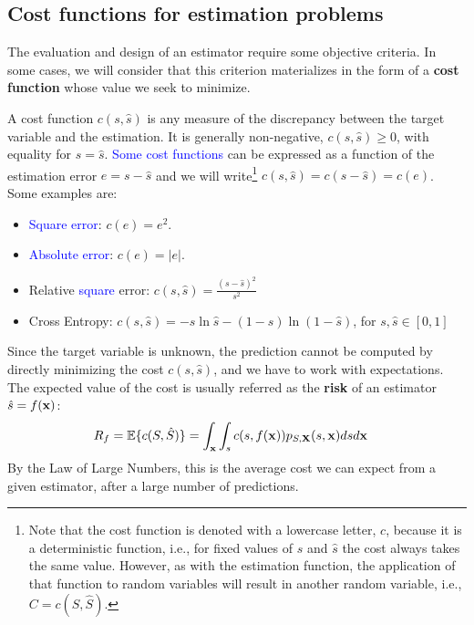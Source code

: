 \subsection{Cost functions for estimation problems}
\label{subsec_funcion_coste}

The evaluation and design of an estimator require some objective criteria. In some cases, we will consider that this criterion materializes in the form of a {\bf cost function} whose value we seek to minimize. %

A cost function $c(s,\hat s)$ is any measure of the discrepancy between the target variable and the estimation. It is generally non-negative, $c(s,\hat s) \geq 0$, with equality for $s = \hat s$. \textcolor{blue}{Some cost functions} can be expressed as a function of the estimation error $e= s-\hat s$ and we will write\footnote{Note that the cost function is denoted with a lowercase letter, $c$, because it is a deterministic function, i.e., for fixed values of $s$ and $\hat s$ the cost always takes the same value. However, as with the estimation function, the application of that function to random variables will result in another random variable, i.e., $C = c(S,\hat S)$.} $c(s,\hat s) = c(s - \hat s) = c(e)$. Some examples are:
\begin{itemize}
\item \textcolor{blue}{Square error}: $c(e) = e^2$.
\item \textcolor{blue}{Absolute error}: $c(e) = |e|$.
\item Relative \textcolor{blue}{square} error: $c(s,\hat s) = \frac{(s-\hat{s})^2}{s^2}$
\item Cross Entropy: $c(s,\hat s) = - s \ln \hat s - (1-s) \ln (1-\hat s)$, for $s,\hat{s}\in [0,1]$
\end{itemize}

Since the target variable is unknown, the prediction cannot be computed by directly minimizing the cost $c(s, \hat s)$, and we have to work with expectations. The expected value of the cost is usually referred as the {\bf risk} of an estimator $\hat{s}=f({\bf x})$:
\begin{align}
\label{Est:coste_medio_gen}
R_f = \mathbb{E}\{c(S,\hat S)\} 
    & = \int_{\bf x} \int_s c(s,f({\bf x})) p_{S,{\bf X}}(s,{\bf x}) ds d{\bf x}
\end{align}
By the Law of Large Numbers, this is the average cost we can expect from a given estimator, after a large number of predictions.


